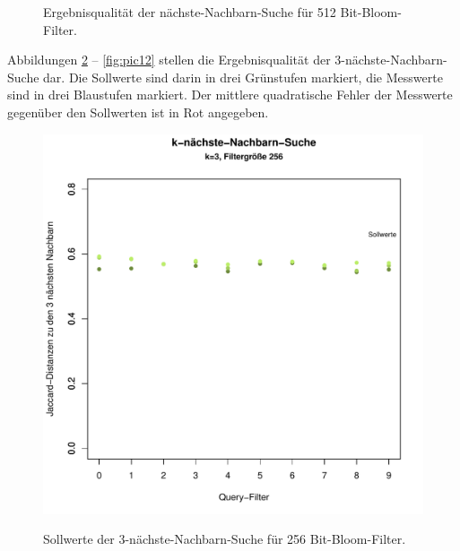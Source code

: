 \begin{figure}[hpbt]
  	\caption[Ergebnisqualität der nächste-Nachbarn-Suche für 256 Bit-Bloom-Filter]{Ergebnisqualität der nächste-Nachbarn-Suche für 512 Bit-Bloom-Filter.}\label{fig:pic8}
\end{figure}
Abbildungen \ref{fig:pic9} -- \ref{fig:pic12} stellen die Ergebnisqualität der 3-nächste-Nachbarn-Suche dar. Die Sollwerte sind darin in drei Grünstufen markiert, die Messwerte sind in drei Blaustufen markiert. Der mittlere quadratische Fehler der Messwerte gegenüber den Sollwerten ist in Rot angegeben.
\begin{figure}
	\centering
	\includegraphics[scale=0.7]{pictures/nn3_256-1.pdf}\\
	\caption[Sollwerte der 3-nächste-Nachbarn-Suche für 256 Bit-Bloom-Filter]{Sollwerte der 3-nächste-Nachbarn-Suche für 256 Bit-Bloom-Filter.}\label{fig:pic9}

\end{figure}
